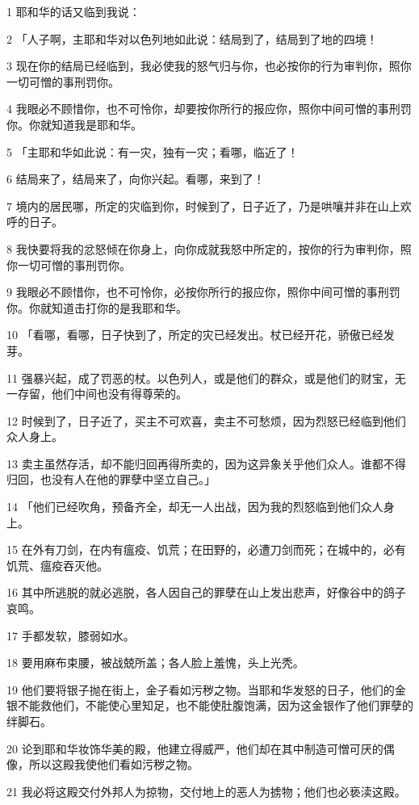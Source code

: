 \par 1 耶和华的话又临到我说：
\par 2 「人子啊，主耶和华对以色列地如此说：结局到了，结局到了地的四境！
\par 3 现在你的结局已经临到，我必使我的怒气归与你，也必按你的行为审判你，照你一切可憎的事刑罚你。
\par 4 我眼必不顾惜你，也不可怜你，却要按你所行的报应你，照你中间可憎的事刑罚你。你就知道我是耶和华。
\par 5 「主耶和华如此说：有一灾，独有一灾；看哪，临近了！
\par 6 结局来了，结局来了，向你兴起。看哪，来到了！
\par 7 境内的居民哪，所定的灾临到你，时候到了，日子近了，乃是哄嚷并非在山上欢呼的日子。
\par 8 我快要将我的忿怒倾在你身上，向你成就我怒中所定的，按你的行为审判你，照你一切可憎的事刑罚你。
\par 9 我眼必不顾惜你，也不可怜你，必按你所行的报应你，照你中间可憎的事刑罚你。你就知道击打你的是我耶和华。
\par 10 「看哪，看哪，日子快到了，所定的灾已经发出。杖已经开花，骄傲已经发芽。
\par 11 强暴兴起，成了罚恶的杖。以色列人，或是他们的群众，或是他们的财宝，无一存留，他们中间也没有得尊荣的。
\par 12 时候到了，日子近了，买主不可欢喜，卖主不可愁烦，因为烈怒已经临到他们众人身上。
\par 13 卖主虽然存活，却不能归回再得所卖的，因为这异象关乎他们众人。谁都不得归回，也没有人在他的罪孽中坚立自己。」
\par 14 「他们已经吹角，预备齐全，却无一人出战，因为我的烈怒临到他们众人身上。
\par 15 在外有刀剑，在内有瘟疫、饥荒；在田野的，必遭刀剑而死；在城中的，必有饥荒、瘟疫吞灭他。
\par 16 其中所逃脱的就必逃脱，各人因自己的罪孽在山上发出悲声，好像谷中的鸽子哀鸣。
\par 17 手都发软，膝弱如水。
\par 18 要用麻布束腰，被战兢所盖；各人脸上羞愧，头上光秃。
\par 19 他们要将银子抛在街上，金子看如污秽之物。当耶和华发怒的日子，他们的金银不能救他们，不能使心里知足，也不能使肚腹饱满，因为这金银作了他们罪孽的绊脚石。
\par 20 论到耶和华妆饰华美的殿，他建立得威严，他们却在其中制造可憎可厌的偶像，所以这殿我使他们看如污秽之物。
\par 21 我必将这殿交付外邦人为掠物，交付地上的恶人为掳物；他们也必亵渎这殿。
